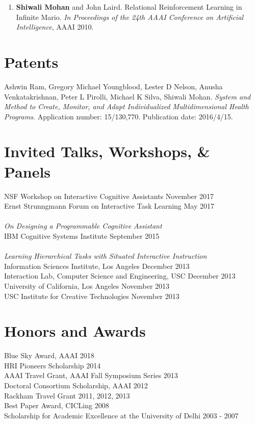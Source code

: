 \documentclass[margin,line,11pt]{res}
\begin{document}
\begin{resume}
\begin{enumerate}[label=\lbrack A\arabic*\rbrack,leftmargin=*]
\item \textbf{Shiwali Mohan} and John Laird. Relational Reinforcement Learning in Infinite Mario. \emph{In Proceedings of the 24th AAAI Conference on Artificial Intelligence}, AAAI 2010.
\end{enumerate}


\section{\sc Patents}
Ashwin Ram, Gregory Michael Youngblood, Lester D Nelson, Anusha Venkatakrishnan, Peter L Pirolli, Michael K Silva, Shiwali Mohan. \emph{System and Method to Create, Monitor, and Adapt Individualized Multidimensional Health Programs}. Application number: 15/130,770. Publication date: 2016/4/15.







\section{\sc Invited Talks, Workshops, \& Panels}
NSF Workshop on Interactive Cognitive Assistants \hfill November 2017\\
Ernst Strunngmann Forum on Interactive Task Learning \hfill May 2017\\ \\
\emph{On Designing a Programmable Cognitive Assistant}\\ IBM Cognitive Systems Institute \hfill September 2015\\ \\
\emph{Learning Hierarchical Tasks with Situated Interactive Instruction}\\ Information Sciences Institute, Los Angeles \hfill December 2013\\
Interaction Lab, Computer Science and Engineering, USC \hfill December 2013\\
University of California, Los Angeles \hfill November 2013\\
USC Institute for Creative Technologies \hfill November 2013

\section{\sc Honors and Awards}
Blue Sky Award, AAAI \hfill 2018\\
HRI Pioneers Scholarship \hfill 2014\\
AAAI Travel Grant, AAAI Fall Symposium Series \hfill 2013\\
Doctoral Consortium Scholarship, AAAI \hfill 2012 \\
Rackham Travel Grant \hfill 2011, 2012, 2013 \\
Best Paper Award, CICLing \hfill 2008 \\
Scholarship for Academic Excellence at the University of Delhi \hfill 2003 - 2007


\end{resume}
\end{document}
